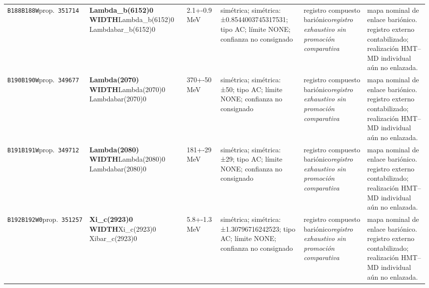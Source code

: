 \begin{landscape}
\begin{longtable}{L{1.85cm}L{4.45cm}L{2.35cm}L{4.05cm}L{3.35cm}L{7.15cm}}
\texttt{B188}\newline \texttt{B188W}\newline prop.\ \texttt{351714} & \textbf{Lambda\_\allowbreak{}b(6152)0 WIDTH}\newline Lambda\_\allowbreak{}b(6152)0 \textbar{}\allowbreak{} Lambdabar\_\allowbreak{}b(6152)0 & 2.1+-0.9\,MeV & simétrica; simétrica: ±0.8544003745317531; tipo AC; límite NONE; confianza no consignado & registro compuesto bariónico\newline \emph{registro exhaustivo sin promoción comparativa} & mapa nominal de enlace bariónico. registro externo contabilizado; realización HMT--MD individual aún no enlazada. \\
\texttt{B190}\newline \texttt{B190W}\newline prop.\ \texttt{349677} & \textbf{Lambda(2070) WIDTH}\newline Lambda(2070)0 \textbar{}\allowbreak{} Lambdabar(2070)0 & 370+-50\,MeV & simétrica; simétrica: ±50; tipo AC; límite NONE; confianza no consignado & registro compuesto bariónico\newline \emph{registro exhaustivo sin promoción comparativa} & mapa nominal de enlace bariónico. registro externo contabilizado; realización HMT--MD individual aún no enlazada. \\
\texttt{B191}\newline \texttt{B191W}\newline prop.\ \texttt{349712} & \textbf{Lambda(2080) WIDTH}\newline Lambda(2080)0 \textbar{}\allowbreak{} Lambdabar(2080)0 & 181+-29\,MeV & simétrica; simétrica: ±29; tipo AC; límite NONE; confianza no consignado & registro compuesto bariónico\newline \emph{registro exhaustivo sin promoción comparativa} & mapa nominal de enlace bariónico. registro externo contabilizado; realización HMT--MD individual aún no enlazada. \\
\texttt{B192}\newline \texttt{B192W0}\newline prop.\ \texttt{351257} & \textbf{Xi\_\allowbreak{}c(2923)0 WIDTH}\newline Xi\_\allowbreak{}c(2923)0 \textbar{}\allowbreak{} Xibar\_\allowbreak{}c(2923)0 & 5.8+-1.3\,MeV & simétrica; simétrica: ±1.30796716242523; tipo AC; límite NONE; confianza no consignado & registro compuesto bariónico\newline \emph{registro exhaustivo sin promoción comparativa} & mapa nominal de enlace bariónico. registro externo contabilizado; realización HMT--MD individual aún no enlazada. \\

\end{longtable}
\end{landscape}
